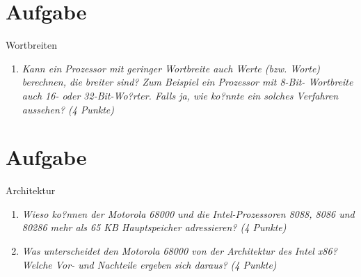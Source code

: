 \documentclass[10pt]{article}
\begin{document}
\section{Aufgabe}
Wortbreiten
\begin{enumerate}[label=\alph*)]
	\item 
	\textit{Kann ein Prozessor mit geringer Wortbreite auch Werte (bzw. Worte) berechnen, die breiter sind? Zum Beispiel ein Prozessor mit 8-Bit- Wortbreite auch 16- oder 32-Bit-Wo?rter. Falls ja, wie ko?nnte ein solches Verfahren aussehen? (4 Punkte)}
	
\end{enumerate}
\newpage





\section{Aufgabe}
Architektur
\begin{enumerate}[label=\alph*)]
	\item 
	\textit{Wieso ko?nnen der Motorola 68000 und die Intel-Prozessoren 8088, 8086 und 80286 mehr als 65 KB Hauptspeicher adressieren?
(4 Punkte)	}
	

	
	\item
	\textit{Was unterscheidet den Motorola 68000 von der Architektur des Intel x86? Welche Vor- und Nachteile ergeben sich daraus? (4 Punkte)}
\end{enumerate}
\newpage
\end{document}
